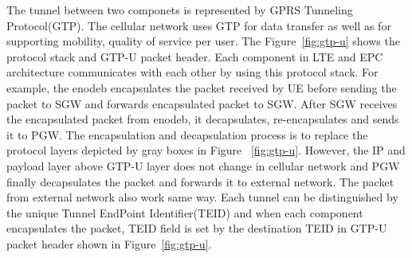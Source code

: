 The tunnel between two componets is represented by GPRS Tunneling Protocol(GTP). The cellular network uses GTP for data transfer as well as for supporting mobility, quality of service per user. The Figure~\ref{fig:gtp-u} shows the protocol stack and GTP-U packet header. Each component in LTE and EPC architecture communicates with each other by using this protocol stack. For example, the enodeb encapsulates the packet received by UE before sending the packet to SGW and forwards encapsulated packet to SGW.  After SGW receives the encapsulated packet from enodeb, it decapsulates, re-encapsulates and sends it to PGW. The encapsulation and decapsulation process is to replace the protocol layers depicted by gray boxes in Figure ~\ref{fig:gtp-u}. However, the IP and payload layer above GTP-U layer does not change in cellular network and PGW finally decapsulates the packet and forwards it to external network. The packet from external network also work same way. Each tunnel can be distinguished by the unique Tunnel EndPoint Identifier(TEID) and when each component encapsulates the packet, TEID field is set by the destination TEID in GTP-U packet header shown in Figure~\ref{fig:gtp-u}.
